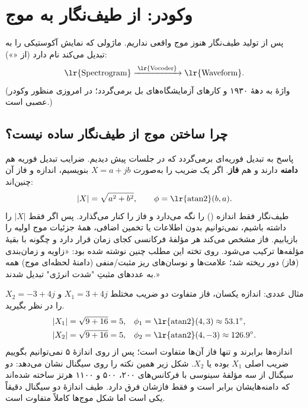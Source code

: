 \section{وکودر: از طیف‌نگار به موج}

پس از تولید طیف‌نگار هنوز موج واقعی نداریم. ماژولی که نمایش آکوستیکی را به  تبدیل می‌کند  نام دارد (از «»):
\[
\text{\lr{Spectrogram}} \xrightarrow{\;\text{\lr{Vocoder}}\;} \text{\lr{Waveform}}.
\]
(واژهٔ  به دههٔ ۱۹۳۰ و کارهای آزمایشگاه‌های بل برمی‌گردد؛ در  امروزی منظور وکودر عصبی است.)

\subsection{چرا ساختن موج از طیف‌نگار ساده نیست؟}
پاسخ به تبدیل فوریه‌ای برمی‌گردد که در جلسات پیش دیدیم. ضرایب تبدیل فوریه هم \textbf{دامنه} دارند و هم \textbf{فاز}. اگر یک ضریب را به‌صورت $X = a + jb$ بنویسیم، اندازه و فاز آن چنین‌اند:
\[
|X| = \sqrt{a^{2}+b^{2}}, \qquad \phi = \text{\lr{atan2}}(b,a).
\]
طیف‌نگار فقط اندازه () را نگه می‌دارد و فاز را کنار می‌گذارد. پس اگر فقط $|X|$ را داشته باشیم، نمی‌توانیم بدون اطلاعات یا تخمین اضافی، همهٔ جزئیات موج اولیه را بازیابیم. فاز مشخص می‌کند هر مؤلفهٔ فرکانسی کجای زمان قرار دارد و چگونه با بقیهٔ مؤلفه‌ها ترکیب می‌شود. روی تخته این مطلب چنین نوشته شده بود: «زاویه و زمان‌بندی (فاز) دور ریخته شد؛ علامت‌ها و نوسان‌های ریز مثبت/منفی (دامنهٔ لحظه‌ای موج) همه به عددهای مثبتِ "شدت انرژی" تبدیل شدند.»

\begin{addedbox}{مثال عددی: اندازه یکسان، فاز متفاوت}
دو ضریب مختلط $X_1 = 3+4j$ و $X_2 = -3+4j$ را در نظر بگیرید.
\begin{align*}
|X_1| &= \sqrt{9+16} = 5, & \phi_1 &= \text{\lr{atan2}}(4,3) \approx 53.1^\circ,\\
|X_2| &= \sqrt{9+16} = 5, & \phi_2 &= \text{\lr{atan2}}(4,-3) \approx 126.9^\circ .
\end{align*}
اندازه‌ها برابرند و تنها فاز آن‌ها متفاوت است؛ پس از روی اندازهٔ ۵ نمی‌توانیم بگوییم ضریب اصلی $X_1$ بوده یا $X_2$. شکل زیر همین نکته را روی سیگنال نشان می‌دهد: دو سیگنال از سه مؤلفهٔ سینوسی با فرکانس‌های ۲۰۰، ۵۰۰ و ۱۱۰۰ هرتز ساخته شده‌اند که دامنه‌هایشان برابر است و فقط فازشان فرق دارد. طیف اندازهٔ دو سیگنال دقیقاً یکی است اما شکل موج‌ها کاملاً متفاوت است.
\end{addedbox}


